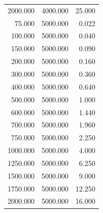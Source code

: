 {\begin{longtable}{rrr}
2000.000 & 4000.000 & 25.000 \\
75.000 & 5000.000 & 0.022 \\
100.000 & 5000.000 & 0.040 \\
150.000 & 5000.000 & 0.090 \\
200.000 & 5000.000 & 0.160 \\
300.000 & 5000.000 & 0.360 \\
400.000 & 5000.000 & 0.640 \\
500.000 & 5000.000 & 1.000 \\
600.000 & 5000.000 & 1.440 \\
700.000 & 5000.000 & 1.960 \\
750.000 & 5000.000 & 2.250 \\
1000.000 & 5000.000 & 4.000 \\
1250.000 & 5000.000 & 6.250 \\
1500.000 & 5000.000 & 9.000 \\
1750.000 & 5000.000 & 12.250 \\
2000.000 & 5000.000 & 16.000 \\
\end{longtable}
}
